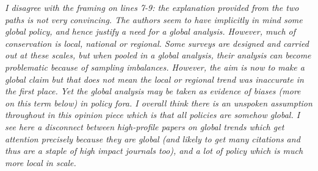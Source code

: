 \documentclass[11pt,letter]{article}
\begin{document}


\begin{mybox}
\emph{I disagree with the framing on lines 7-9: the explanation provided from the two paths is not
very convincing. The authors seem to have implicitly in mind some global policy, and hence
justify a need for a global analysis. However, much of conservation is local, national or
regional. Some surveys are designed and carried out at these scales, but when pooled in a
global analysis, their analysis can become problematic because of sampling imbalances.
However, the aim is now to make a global claim but that does not mean the local or regional
trend was inaccurate in the first place. Yet the global analysis may be taken as evidence of
biases (more on this term below) in policy fora. I overall think there is an unspoken assumption
throughout in this opinion piece which is that all policies are somehow global. I see here a
disconnect between high-profile papers on global trends which get attention precisely because
they are global (and likely to get many citations and thus are a staple of high impact journals
too), and a lot of policy which is much more local in scale.}  
\end{mybox}
\end{document}
